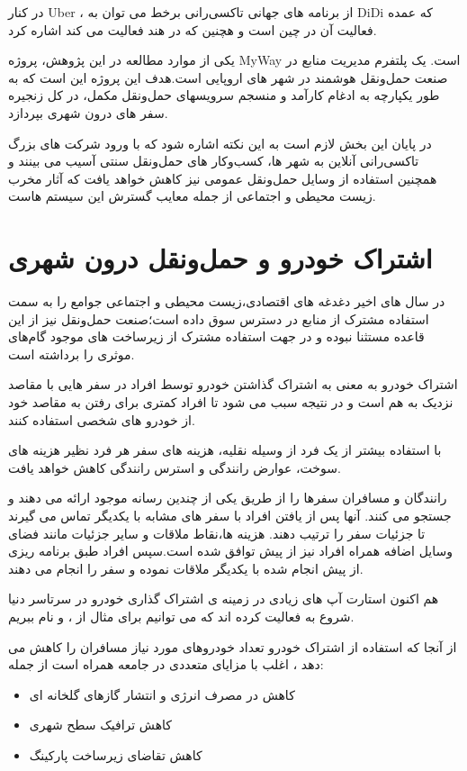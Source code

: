 در کنار Uber ، از برنامه های جهانی تاکسی‌رانی برخط می توان به DiDi که عمده فعالیت آن در چین است و هچنین  که در هند فعالیت می کند اشاره کرد.

یکی از موارد مطالعه در این پژوهش، پروژه MyWay است. یک پلتفرم مدیریت منابع در صنعت حمل‌و‌نقل هوشمند در شهر های اروپایی است.هدف این پروژه این است که به طور یکپارچه به ادغام کارآمد و منسجم  سرویسهای حمل‌و‌نقل مکمل، در کل زنجیره سفر های درون شهری بپردازد.

در پایان این بخش لازم است به این نکته اشاره شود که با ورود شرکت های بزرگ تاکسی‌رانی آنلاین به شهر ها، کسب‌و‌کار های حمل‌و‌نقل سنتی آسیب می بینند و همچنین استفاده از وسایل حمل‌و‌نقل عمومی نیز کاهش خواهد یافت که آثار مخرب زیست محیطی و اجتماعی از جمله معایب گسترش این سیستم هاست.

\section{اشتراک خودرو و حمل‌و‌نقل درون شهری}
در سال های اخیر دغدغه های اقتصادی،‌زیست محیطی و اجتماعی جوامع را به سمت استفاده مشترک از منابع در دسترس سوق داده است؛صنعت حمل‌و‌نقل نیز از این قاعده مستثنا نبوده و در جهت استفاده مشترک از زیرساخت های موجود گام‌های موثری را برداشته است.

اشتراک خودرو به معنی به اشتراک گذاشتن خودرو توسط افراد در سفر هایی با مقاصد نزدیک به هم است و در نتیجه سبب می شود تا افراد کمتری برای رفتن به مقاصد خود از خودرو های شخصی استفاده کنند.

با استفاده بیشتر از یک فرد از وسیله نقلیه، هزینه های سفر هر فرد نظیر  هزینه های سوخت، عوارض رانندگی و استرس رانندگی کاهش خواهد یافت.

رانندگان و مسافران سفرها را از طریق یکی از چندین رسانه موجود ارائه می دهند و جستجو می کنند. آنها پس از یافتن افراد با سفر های مشابه با یکدیگر تماس می گیرند تا جزئیات سفر را ترتیب دهند. هزینه ها،‌نقاط ملاقات و سایر جزئیات مانند فضای وسایل اضافه همراه افراد نیز از پیش توافق شده است.‌‌سپس افراد طبق برنامه ریزی از پیش انجام شده با یکدیگر ملاقات نموده و سفر را انجام می دهند.

هم اکنون استارت آپ های زیادی در زمینه ی اشتراک گذاری خودرو در سرتاسر دنیا شروع به فعالیت کرده اند که می توانیم برای مثال از  ،  و  نام ببریم.

از آنجا که استفاده از اشتراک خودرو تعداد خودر‌و‌های مورد نیاز مسافران را کاهش می دهد ، اغلب با مزایای متعددی در جامعه همراه است از جمله: 
\begin{itemize}
\item
کاهش در مصرف انرژی و انتشار گازهای گلخانه ای
\item
کاهش ترافیک سطح شهری
\item
کاهش تقاضای زیرساخت پارکینگ
\end{itemize}
